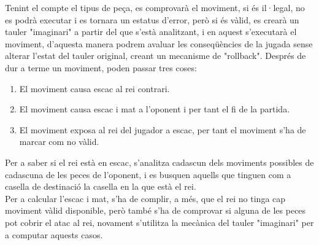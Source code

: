 Tenint el compte el tipus de peça, es comprovarà el moviment, si és il·legal, no es podrà executar i es tornara un estatus d'error, però si és vàlid, es crearà un tauler "imaginari" a partir del que s'està analitzant, i en aquest s'executarà el moviment, d'aquesta manera podrem avaluar les conseqüències de la jugada sense alterar l'estat del tauler original, creant un mecanisme de "rollback". Després de dur a terme un moviment, poden passar tres coses:
\begin{enumerate}
    \item El moviment causa escac al rei contrari.
    \item El moviment causa escac i mat a l'oponent i per tant el fi de la partida.
    \item El moviment exposa al rei del jugador a escac, per tant el moviment s'ha de marcar com no vàlid.
\end{enumerate}
Per a saber si el rei està en escac, s'analitza cadascun dels moviments possibles de cadascuna de les peces de l'oponent, i es busquen aquells que tinguen com a casella de destinació la casella en la que està el rei. 
\\[3mm]
Per a calcular l'escac i mat, s'ha de complir, a més, que el rei no tinga cap moviment vàlid disponible, però també s'ha de comprovar si alguna de les peces pot cobrir el atac al rei, novament s'utilitza la mecànica del tauler "imaginari" per a computar aquests casos.
